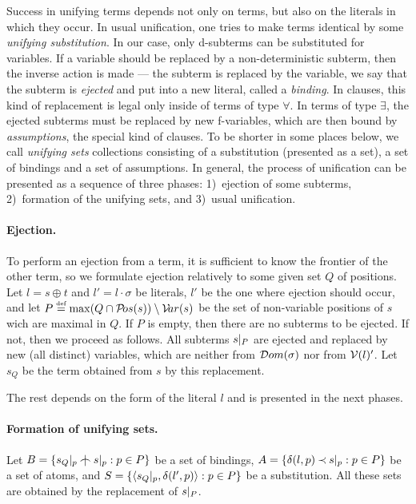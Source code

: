 Success in unifying terms depends not only on terms, but also on the literals in which
they occur.  In usual unification, one tries to make terms identical by
some {\em unifying substitution}.  In our case, only d-subterms can be substituted
for variables.  If a variable  should be replaced by a
non-deterministic subterm, then the inverse action is made --- the subterm is
replaced by the variable, we say that the subterm is {\em ejected} and put
into a new literal, called a {\em binding}.  In clauses, this kind of
replacement is legal only inside of terms of type $\forall$.  In terms of
type $\exists$, the ejected subterms must be replaced by new f-variables,
which are then bound by {\em assumptions}, the special kind of clauses.  To
be shorter in some places below, we call {\em unifying sets} collections
consisting of a substitution (presented as a set), a set of bindings and a
set of assumptions.  In general, the process of unification can be presented
as a sequence of three phases: 1)~ejection of some subterms, 2)~formation of
the unifying sets, and 3)~usual unification.
%
\paragraph{Ejection.\ }
%
To perform an ejection from a term, it is sufficient to know the frontier
of the other term, so we formulate ejection relatively to some given
set $Q$ of positions.  Let \(l= s\oplus t\) and \(l'=l\cdot \sigma\) be
literals, $l'$ be the one where ejection should occur, and let \(P
\mathrel {\stackrel {\mbox {\tiny def}}{=}} \max(Q\cap{\sl{\cal P}\!os}(s))\setminus {\sl{\cal V}\!ar}(s)\) be the set of non-variable positions of
$s$ wich are maximal in $Q$.  If $P$ is empty, then there are no
subterms to be ejected.  If not, then we proceed as follows.  All subterms
\(s|_{P}\) are ejected and replaced by new (all distinct) variables,
which are neither from \({\sl{\cal D}om} (\sigma)\) nor from \({\cal V}(l)'\).  Let $s_Q$ be
the term obtained from $s$ by this replacement. 

The rest depends on the form of the literal $l$ and is presented in the next
phases. 
%
\paragraph{Formation of unifying sets.\ }
%
Let \(B =\{\subterm {s_Q} p\notInt \subterm sp: p\in P\}\) be a set of
bindings, \(A =\{\delta(l,p)\mathbin{\prec} s|_{p}: p\in P\}\) be a set of atoms,
and \(S =\{\langle s_Q|_{p} ,\delta(l',p)\rangle: p\in P\}\) be a substitution. All
these sets are obtained by the replacement of \(s|_{P}\).

